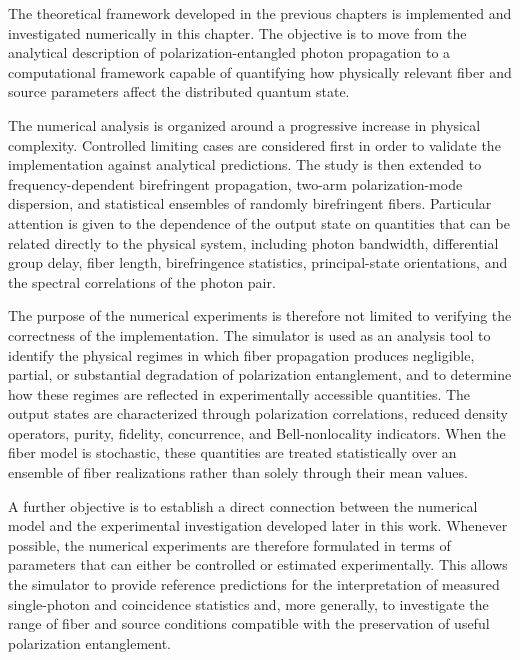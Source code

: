 
The theoretical framework developed in the previous chapters is implemented and
investigated numerically in this chapter. The objective is to move from the
analytical description of polarization-entangled photon propagation to a
computational framework capable of quantifying how physically relevant fiber and
source parameters affect the distributed quantum state.

The numerical analysis is organized around a progressive increase in physical
complexity. Controlled limiting cases are considered first in order to validate the
implementation against analytical predictions. The study is then extended to
frequency-dependent birefringent propagation, two-arm polarization-mode
dispersion, and statistical ensembles of randomly birefringent fibers. Particular
attention is given to the dependence of the output state on quantities that can be
related directly to the physical system, including photon bandwidth, differential
group delay, fiber length, birefringence statistics, principal-state orientations,
and the spectral correlations of the photon pair.

The purpose of the numerical experiments is therefore not limited to verifying the
correctness of the implementation. The simulator is used as an analysis tool to
identify the physical regimes in which fiber propagation produces negligible,
partial, or substantial degradation of polarization entanglement, and to determine
how these regimes are reflected in experimentally accessible quantities. The
output states are characterized through polarization correlations, reduced density
operators, purity, fidelity, concurrence, and Bell-nonlocality indicators. When the
fiber model is stochastic, these quantities are treated statistically over an
ensemble of fiber realizations rather than solely through their mean values.

A further objective is to establish a direct connection between the numerical model
and the experimental investigation developed later in this work. Whenever
possible, the numerical experiments are therefore formulated in terms of parameters
that can either be controlled or estimated experimentally. This allows the
simulator to provide reference predictions for the interpretation of measured
single-photon and coincidence statistics and, more generally, to investigate the
range of fiber and source conditions compatible with the preservation of useful
polarization entanglement.

